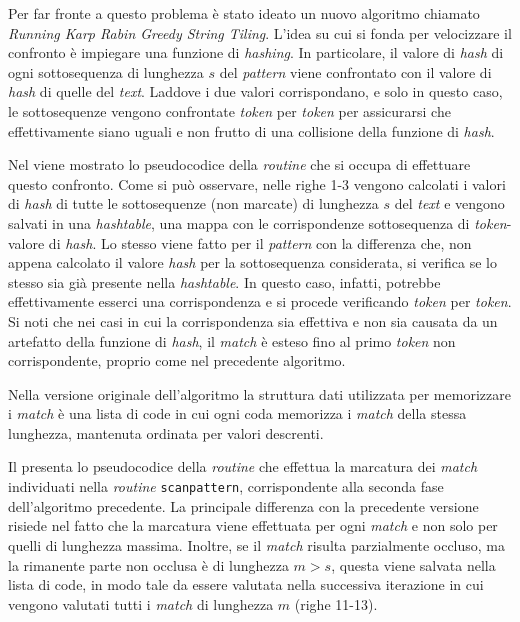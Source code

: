 Per far fronte a questo problema è stato ideato un nuovo algoritmo chiamato \textit{Running Karp Rabin Greedy String Tiling}.
%
L'idea su cui si fonda per velocizzare il confronto è impiegare una funzione di \textit{hashing}.
%
In particolare, il valore di \textit{hash} di ogni sottosequenza di lunghezza $s$ del \textit{pattern} viene confrontato con il valore di \textit{hash} di quelle del \textit{text}.
%
Laddove i due valori corrispondano, e solo in questo caso, le sottosequenze vengono confrontate \textit{token} per \textit{token} per assicurarsi che effettivamente siano uguali e non frutto di una collisione della funzione di \textit{hash}.

Nel  viene mostrato lo pseudocodice della \textit{routine} che si occupa di effettuare questo confronto.
%
Come si può osservare, nelle righe 1-3 vengono calcolati i valori di \textit{hash} di tutte le sottosequenze (non marcate) di lunghezza $s$ del \textit{text} e vengono salvati in una \textit{hashtable}, una mappa con le corrispondenze sottosequenza di \textit{token}-valore di \textit{hash}.
%
Lo stesso viene fatto per il \textit{pattern} con la differenza che, non appena calcolato il valore \textit{hash} per la sottosequenza considerata, si verifica se lo stesso sia già presente nella \textit{hashtable}.
%
In questo caso, infatti, potrebbe effettivamente esserci una corrispondenza e si procede verificando \textit{token} per \textit{token}.
%
Si noti che nei casi in cui la corrispondenza sia effettiva e non sia causata da un artefatto della funzione di \textit{hash}, il \textit{match} è esteso fino al primo \textit{token} non corrispondente, proprio come nel precedente algoritmo.



Nella versione originale dell'algoritmo la struttura dati utilizzata per memorizzare i \textit{match} è una lista di code in cui ogni coda memorizza i \textit{match} della stessa lunghezza, mantenuta ordinata per valori descrenti.

Il  presenta lo pseudocodice della \textit{routine} che effettua la marcatura dei \textit{match} individuati nella \textit{routine} \texttt{scanpattern}, corrispondente alla seconda fase dell'algoritmo precedente.
%
La principale differenza con la precedente versione risiede nel fatto che la marcatura viene effettuata per ogni \textit{match} e non solo per quelli di lunghezza massima.
%
Inoltre, se il \textit{match} risulta parzialmente occluso, ma la rimanente parte non occlusa è  di lunghezza $m > s$, questa viene salvata nella lista di code, in modo tale da essere valutata nella successiva iterazione in cui vengono valutati tutti i \textit{match} di lunghezza $m$ (righe 11-13).

